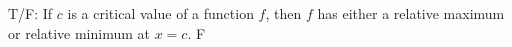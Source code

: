 {T/F: If $c$ is a critical value of a function $f$, then $f$ has either a relative maximum or relative minimum at $x=c$. 
}
{F
}

